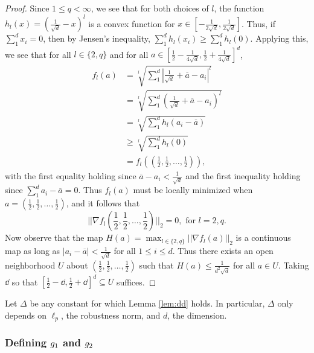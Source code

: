 \begin{proof}
Since $1 \leq q < \infty$, we see that for both choices of $l$, the function $h_l(x) = (\frac{1}{\sqrt{d}} - x)^l$ is a convex function for $x \in [-\frac{1}{2\sqrt{d}}, \frac{1}{2\sqrt{d}}]$. Thus, if $\sum_1^d x_i = 0$, then by Jensen's inequality, $\sum_1^d h_l(x_i) \geq \sum_1^d h_l(0)$. Applying this, we see that for all $l \in \{2, q\}$ and for all $a \in [\frac{1}{2} - \frac{1}{4\sqrt{d}}, \frac{1}{2} + \frac{1}{4\sqrt{d}}]^d$, 
\begin{equation*}
\begin{split}
f_l(a) &= \sqrt[l]{\sum_1^d |\frac{1}{\sqrt{d}} + \overline{a} - a_i|^l} \\
&= \sqrt[l]{\sum_1^d \left(\frac{1}{\sqrt{d}} + \overline{a} - a_i\right)^l} \\
&= \sqrt[l]{\sum_1^d h_l(a_i - \overline{a})} \\
&\geq \sqrt[l]{\sum_1^d h_l(0)} \\
&= f_l((\frac{1}{2}, \frac{1}{2}, \dots, \frac{1}{2})),
\end{split}
\end{equation*}
with the first equality holding since $\overline{a} - a_i < \frac{1}{\sqrt{d}}$ and the first inequality holding since $\sum_1^d a_i - \overline{a} = 0$. Thus $f_l(a)$ must be locally minimized when $a = (\frac{1}{2}, \frac{1}{2}, \dots, \frac{1}{2})$, and it follows that $$||\nabla f_l(\frac{1}{2}, \frac{1}{2}, \dots, \frac{1}{2})||_2 = 0, \text{ for } l = 2, q.$$ Now observe that the map $H(a) = \max_{l \in \{2, q\}} ||\nabla f_l(a)||_2$ is a continuous map as long as $|a_i - \overline{a}| < \frac{1}{\sqrt{d}}$ for all $1 \leq i \leq d$. Thus there exists an open neighborhood $U$ about $(\frac{1}{2}, \frac{1}{2}, \dots, \frac{1}{2})$ such that $H(a) \leq \frac{1}{d^2\sqrt{d}}$ for all $a \in U$. Taking $\dd$ so that $[\frac{1}{2} - \dd, \frac{1}{2} + \dd]^d \subseteq U$ suffices. 
\end{proof}

\begin{defn}\label{defn:Delta}
Let $\Delta$ be any constant for which Lemma \ref{lem:dd} holds. In particular, $\Delta$ only depends on $\ell_p$, the robustness norm, and $d$, the dimension.
\end{defn}

\subsubsection{Defining $g_1$ and $g_2$}\label{subsubsec:g1g2}

